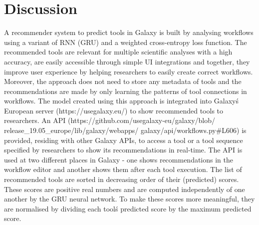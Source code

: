 \documentclass{bioinfo}
\begin{document}
\section{Discussion}
A recommender system to predict tools in Galaxy is built by analysing workflows using a variant of RNN (GRU) and a weighted cross-entropy loss function. The recommended tools are relevant for multiple scientific analyses with a high accuracy, are easily accessible through simple UI integrations and together, they improve user experience by helping researchers to easily create correct workflows. Moreover, the approach does not need to store any metadata of tools and the recommendations are made by only learning the patterns of tool connections in workflows. The model created using this approach is integrated into Galaxy\'s European server (https://usegalaxy.eu/) to show recommended tools to researchers. An API (https://github.com/usegalaxy-eu/galaxy/blob/
release\_19.05\_europe/lib/galaxy/webapps/
galaxy/api/workflows.py\#L606) is provided, residing with other Galaxy APIs, to access a tool or a tool sequence specified by researchers to show its recommendations in real-time. The API is used at two different places in Galaxy - one shows recommendations in the workflow editor and another shows them after each tool execution. The list of recommended tools are sorted in decreasing order of their (predicted) scores. These scores are positive real numbers and are computed independently of one another by the GRU neural network. To make these scores more meaningful, they are normalised by dividing each tool\'s predicted score by the maximum predicted score.
\end{document}
